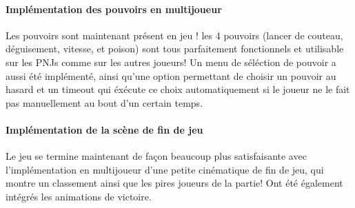 		\paragraph{Implémentation des pouvoirs en multijoueur}
		
			Les pouvoirs sont maintenant présent en jeu ! les 4 pouvoirs (lancer de couteau, déguisement, vitesse, et poison) sont tous parfaitement fonctionnels et utilisable sur les PNJs
			comme sur les autres joueurs! Un menu de séléction de pouvoir a aussi été implémenté, ainsi qu'une option permettant de choisir un pouvoir au hasard et un timeout qui éxécute ce choix
			automatiquement si le joueur ne le fait pas manuellement au bout d'un certain temps.
			
		\paragraph{Implémentation de la scène de fin de jeu}
		
			Le jeu se termine maintenant de façon beaucoup plus satisfaisante avec l'implémentation en multijoueur d'une petite cinématique de fin de jeu, qui montre un classement ainsi
			que les pires joueurs de la partie! Ont été également intégrés les animations de victoire.
		
			
		
		